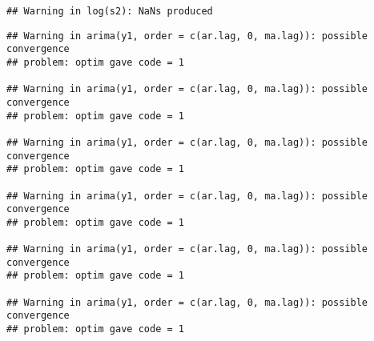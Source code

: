 \documentclass[]{article}
\newenvironment{Shaded}{\begin{snugshade}}{\end{snugshade}}
\newcommand{\AttributeTok}[1]{\textcolor[rgb]{0.77,0.63,0.00}{#1}}
\newcommand{\DecValTok}[1]{\textcolor[rgb]{0.00,0.00,0.81}{#1}}
\newcommand{\ErrorTok}[1]{\textcolor[rgb]{0.64,0.00,0.00}{\textbf{#1}}}
\newcommand{\FunctionTok}[1]{\textcolor[rgb]{0.00,0.00,0.00}{#1}}
\newcommand{\NormalTok}[1]{#1}
\newcommand{\OtherTok}[1]{\textcolor[rgb]{0.56,0.35,0.01}{#1}}
\newcommand{\SpecialCharTok}[1]{\textcolor[rgb]{0.00,0.00,0.00}{#1}}
\newcommand{\StringTok}[1]{\textcolor[rgb]{0.31,0.60,0.02}{#1}}
\begin{document}
\begin{verbatim}
## Warning in log(s2): NaNs produced
\end{verbatim}

\begin{verbatim}
## Warning in arima(y1, order = c(ar.lag, 0, ma.lag)): possible convergence
## problem: optim gave code = 1

## Warning in arima(y1, order = c(ar.lag, 0, ma.lag)): possible convergence
## problem: optim gave code = 1

## Warning in arima(y1, order = c(ar.lag, 0, ma.lag)): possible convergence
## problem: optim gave code = 1

## Warning in arima(y1, order = c(ar.lag, 0, ma.lag)): possible convergence
## problem: optim gave code = 1

## Warning in arima(y1, order = c(ar.lag, 0, ma.lag)): possible convergence
## problem: optim gave code = 1

## Warning in arima(y1, order = c(ar.lag, 0, ma.lag)): possible convergence
## problem: optim gave code = 1
\end{verbatim}

\begin{Shaded}
\end{Shaded}
\end{document}
